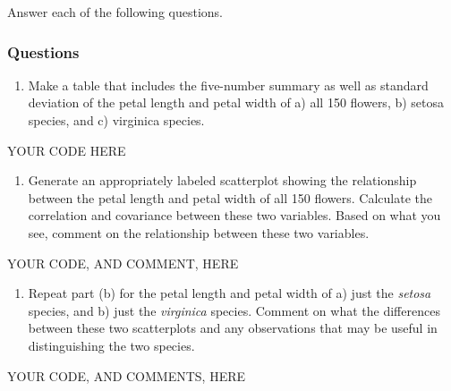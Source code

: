 \documentclass[
]{article}
\newenvironment{Shaded}{\begin{snugshade}}{\end{snugshade}}
\newcommand{\NormalTok}[1]{#1}
\providecommand{\tightlist}{%
  \setlength{\itemsep}{0pt}\setlength{\parskip}{0pt}}
\begin{document}
Answer each of the following questions.

\hypertarget{questions-5}{%
\subsubsection{Questions}\label{questions-5}}

\begin{enumerate}
\def\labelenumi{\arabic{enumi}.}
\tightlist
\item
  Make a table that includes the five-number summary as well as standard
  deviation of the petal length and petal width of a) all 150 flowers,
  b) setosa species, and c) virginica species.
\end{enumerate}

\begin{Shaded}
\begin{Highlighting}[]
\NormalTok{YOUR CODE HERE}
\end{Highlighting}
\end{Shaded}

\begin{enumerate}
\def\labelenumi{\arabic{enumi}.}
\setcounter{enumi}{1}
\tightlist
\item
  Generate an appropriately labeled scatterplot showing the relationship
  between the petal length and petal width of all 150 flowers. Calculate
  the correlation and covariance between these two variables. Based on
  what you see, comment on the relationship between these two variables.
\end{enumerate}

\begin{Shaded}
\begin{Highlighting}[]
\NormalTok{YOUR CODE, AND COMMENT, HERE}
\end{Highlighting}
\end{Shaded}

\begin{enumerate}
\def\labelenumi{\arabic{enumi}.}
\setcounter{enumi}{2}
\tightlist
\item
  Repeat part (b) for the petal length and petal width of a) just the
  \emph{setosa} species, and b) just the \emph{virginica} species.
  Comment on what the differences between these two scatterplots and any
  observations that may be useful in distinguishing the two species.
\end{enumerate}

\begin{Shaded}
\begin{Highlighting}[]
\NormalTok{YOUR CODE, AND COMMENTS, HERE}
\end{Highlighting}
\end{Shaded}
\end{document}
